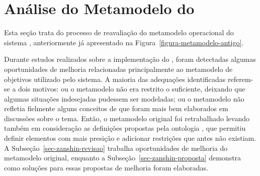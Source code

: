 
\chapter{Análise do Metamodelo do \zanshin}
\label{sec-zanshin}

Esta seção trata do processo de reavaliação do metamodelo operacional do sistema \zanshin, anteriormente já apresentado na Figura~\ref{figura-metamodelo-antigo}.


Durante estudos realizados sobre a implementação do \framework \zanshin, foram detectadas algumas oportunidades de melhoria relacionadas principalmente ao metamodelo de objetivos utilizado pelo sistema. A maioria das adequações identificadas referem-se a dois motivos: ou o metamodelo não era restrito o suficiente, deixando que algumas situações indesejadas pudessem ser modeladas; ou o metamodelo não refletia fielmente alguns conceitos de \gore que foram mais bem elaborados em discussões sobre o tema. Então, o metamodelo original foi retrabalhado levando também em consideração as definições propostas pela ontologia \goro, que permitiu definir elementos com mais presição e adicionar restrições que antes não existiam. A Subseção~\ref{sec-zanshin-revisao} trabalha oportunidades de melhoria do metamodelo original, enquanto a Subseção~\ref{sec-zanshin-proposta} demonstra como soluções para essas propostas de melhoria foram elaboradas.



